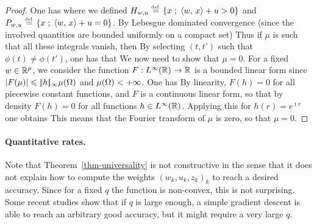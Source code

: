 \begin{proof}
	One has
	where we defined $H_{w,u} \stackrel{\mbox{\upshape\tiny def.}}{=} \left\{ x \;;\; \langle w,\,x\rangle+u > 0 \right\}$ and
	$P_{w,u} \stackrel{\mbox{\upshape\tiny def.}}{=} \left\{ x \;;\; \langle w,\,x\rangle+u = 0 \right\}$.
	By Lebesgue dominated convergence (since the involved quantities are bounded uniformly on a compact set)
	Thus if $\mu$ is such that all these integrals vanish, then 
	By selecting $(t,t')$ such that $\phi(t) \neq \phi(t')$, one has that 
	We now need to show that $\mu=0$.  For a fixed $w \in \mathbb{R}^p$, we consider the function 
	$F : L^\infty(\mathbb{R}) \rightarrow \mathbb{R}$ is a bounded linear form since $|F(\mu)| \leqslant |\!| h |\!|_\infty \mu(\Omega)$ and $\mu(\Omega) < +\infty$. One has
	\eq{
		F(1_{[-u,+\infty[} = \int_{\Om} 1_{[-u,+\infty[}(\dotp{w}{x}) \d \mu(x)
		=  \mu( P_{w,u} ) + \mu( H_{w,u} ) = 0.
 	} 
	By linearity, $F(h)=0$ for all piecewise constant functions, and $F$ is a continuous linear form, so that by density $F(h)=0$ for all functions $h \in L^\infty(\mathbb{R})$. Applying this for $h(r)=e^{\imath r}$ one obtains
	This means that the Fourier transform of $\mu$ is zero, so that $\mu=0$.
\end{proof}

\paragraph{Quantitative rates.}

Note that Theorem~\ref{thm-universality} is not constructive in the sense that it does not explain how to compute the weights $(w_k,u_k,z_k)_k$ to reach a desired accuracy. Since for a fixed $q$ the function is non-convex, this is not surprising. Some recent studies show that if $q$ is large enough, a simple gradient descent is able to reach an arbitrary good accuracy, but it might require a very large $q$.

